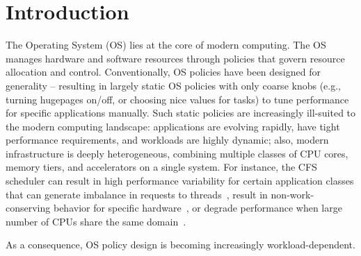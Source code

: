 \section{Introduction}\label{sec:introduction}

The Operating System (OS) lies at the core of modern computing.
The OS manages hardware and software resources through policies that govern resource allocation and control.
Conventionally, OS policies have been designed for generality -- resulting in largely static OS policies with only coarse knobs (e.g., turning hugepages on/off, or choosing nice values for tasks) to tune performance for specific applications manually.
Such static policies are increasingly ill-suited to the modern computing landscape: applications are evolving rapidly, have tight performance requirements, and workloads are highly dynamic; also, modern infrastructure is deeply heterogeneous, combining multiple classes of CPU cores, memory tiers, and accelerators on a single system.
For instance, the CFS scheduler can result in high performance variability for certain application classes that can generate imbalance in requests to threads~\cite{syrup-sosp21,shinjuku-nsdi19}, result in non-work-conserving behavior for specific hardware~\cite{wasted-cores}, or degrade performance when large number of CPUs share the same domain~\cite{meta-lavd}. 

As a consequence, OS policy design is becoming increasingly workload-dependent. 

